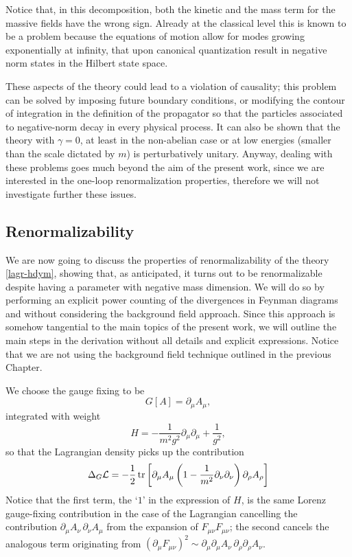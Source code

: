 Notice that, in this decomposition, both the kinetic and the mass term for the massive fields have the wrong sign. Already at the classical level this is known to be a problem because the equations of motion allow for modes growing exponentially at infinity, that upon canonical quantization result in negative norm states in the Hilbert state space.


These aspects of the theory could lead to a violation of causality; this problem can be solved by imposing future boundary conditions, or modifying the contour of integration in the definition of the propagator so that the particles associated to negative-norm decay in every physical process. It can also be shown that the theory with $\gamma = 0$, at least in the non-abelian case or at low energies (smaller than the scale dictated by $m$) is perturbatively unitary. Anyway, dealing with  these problems goes much beyond the aim of the present work, since we are interested in the one-loop renormalization properties, therefore we will not investigate further these issues.










\subsection{Renormalizability}

We are now going to discuss the properties of renormalizability of the theory \eqref{lagr-hdym}, showing that, as anticipated, it turns out to be renormalizable despite having a parameter with negative mass dimension. We will do so by performing an explicit power counting of the divergences in Feynman diagrams and without considering the background field approach. Since this approach is somehow tangential to the main topics of the present work, we will outline the main steps in the derivation without all details and explicit expressions. Notice that we are not using the background field technique outlined in the previous Chapter.

We choose the gauge fixing to be
\begin{equation}
G[A] = \partial_\mu A_\mu,
\end{equation}
integrated with weight 
\begin{equation}
 H = - \frac{1}{m^2 g^2}\partial_\mu \partial_\mu + \frac{1}{g^2},
\end{equation}
so that the Lagrangian density picks up the contribution
\begin{equation}\label{hdym-renorm-gauge-fixing}
\Delta_G { \mathcal{L} }
	=
	-
\frac{1}{2}
\operatorname{tr} \left[ 
	\partial_\mu A_\mu 
	\left( 1 - \frac{1}{m^2}\partial_\nu \partial_\nu \right)
	\partial_\rho A_\rho
\right]
\end{equation}
Notice that the first term, \ie the `$1$'  in the expression of $H$, is the same Lorenz gauge-fixing contribution in the case of the \ym{} Lagrangian cancelling the contribution $\partial_\mu A_\nu \, \partial_\nu A_\mu$ from the expansion of $F_{\mu\nu}F_{\mu\nu}$; the second cancels the analogous term originating from $(\partial_\mu F_{\mu\nu})^2 \sim \partial_\mu \partial_\mu A_\nu \, \partial_\rho  \partial_\rho A_\nu  $.

